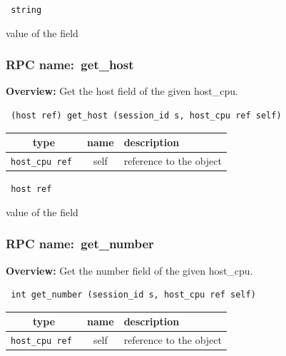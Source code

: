 \vspace{0.3cm}

{\tt 
string
}


value of the field
\vspace{0.3cm}
\vspace{0.3cm}
\vspace{0.3cm}
\subsubsection{RPC name:~get\_host}

{\bf Overview:} 
Get the host field of the given host\_cpu.

\begin{verbatim} (host ref) get_host (session_id s, host_cpu ref self)\end{verbatim}



 
\vspace{0.3cm}
\begin{tabular}{|c|c|p{7cm}|}
 \hline
{\bf type} & {\bf name} & {\bf description} \\ \hline
{\tt host\_cpu ref } & self & reference to the object \\ \hline 

\end{tabular}

\vspace{0.3cm}

{\tt 
host ref
}


value of the field
\vspace{0.3cm}
\vspace{0.3cm}
\vspace{0.3cm}
\subsubsection{RPC name:~get\_number}

{\bf Overview:} 
Get the number field of the given host\_cpu.

\begin{verbatim} int get_number (session_id s, host_cpu ref self)\end{verbatim}



 
\vspace{0.3cm}
\begin{tabular}{|c|c|p{7cm}|}
 \hline
{\bf type} & {\bf name} & {\bf description} \\ \hline
{\tt host\_cpu ref } & self & reference to the object \\ \hline 

\end{tabular}

